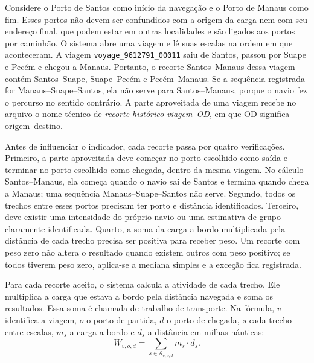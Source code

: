 \documentclass[12pt,a4paper]{report}
\begin{document}
Considere o Porto de Santos como início da navegação e o Porto de Manaus como fim. Esses portos não devem ser confundidos com a origem da carga nem com seu endereço final, que podem estar em outras localidades e são ligados aos portos por caminhão. O sistema abre uma viagem e lê suas escalas na ordem em que aconteceram. A viagem \texttt{voyage\_9612791\_00011} saiu de Santos, passou por Suape e Pecém e chegou a Manaus. Portanto, o recorte Santos--Manaus dessa viagem contém Santos--Suape, Suape--Pecém e Pecém--Manaus. Se a sequência registrada for Manaus--Suape--Santos, ela não serve para Santos--Manaus, porque o navio fez o percurso no sentido contrário. A parte aproveitada de uma viagem recebe no arquivo o nome técnico de \emph{recorte histórico viagem--OD}, em que OD significa origem--destino.

Antes de influenciar o indicador, cada recorte passa por quatro verificações. Primeiro, a parte aproveitada deve começar no porto escolhido como saída e terminar no porto escolhido como chegada, dentro da mesma viagem. No cálculo Santos--Manaus, ela começa quando o navio sai de Santos e termina quando chega a Manaus; uma sequência Manaus--Suape--Santos não serve. Segundo, todos os trechos entre esses portos precisam ter porto e distância identificados. Terceiro, deve existir uma intensidade do próprio navio ou uma estimativa de grupo claramente identificada. Quarto, a soma da carga a bordo multiplicada pela distância de cada trecho precisa ser positiva para receber peso. Um recorte com peso zero não altera o resultado quando existem outros com peso positivo; se todos tiverem peso zero, aplica-se a mediana simples e a exceção fica registrada.

Para cada recorte aceito, o sistema calcula a atividade de cada trecho. Ele multiplica a carga que estava a bordo pela distância navegada e soma os resultados. Essa soma é chamada de trabalho de transporte. Na fórmula, \(v\) identifica a viagem, \(o\) o porto de partida, \(d\) o porto de chegada, \(s\) cada trecho entre escalas, \(m_s\) a carga a bordo e \(d_s\) a distância em milhas náuticas:
\begin{equation}
W_{v,o,d} = \sum_{s \in \mathcal{S}_{v,o,d}} m_s \cdot d_s.
\label{eq:segment-weight}
\end{equation}
\end{document}

